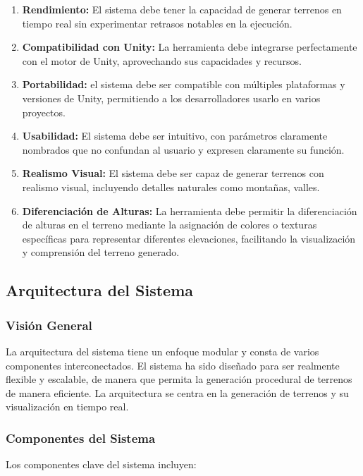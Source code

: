 \begin{enumerate}
    \item \textbf{Rendimiento:} El sistema debe tener la capacidad de generar terrenos en tiempo real sin experimentar retrasos notables en la ejecución.
    
    \item \textbf{Compatibilidad con Unity:} La herramienta debe integrarse perfectamente con el motor de Unity, aprovechando sus capacidades y recursos.
    
    \item \textbf{Portabilidad:} el sistema debe ser compatible con múltiples plataformas y versiones de Unity, permitiendo a los desarrolladores usarlo en varios proyectos.
    
    \item \textbf{Usabilidad:} El sistema debe ser intuitivo, con parámetros claramente nombrados que no confundan al usuario y expresen claramente su función.
    
    \item \textbf{Realismo Visual:} El sistema debe ser capaz de generar terrenos con realismo visual, incluyendo detalles naturales como montañas, valles.
    
    \item \textbf{Diferenciación de Alturas:} La herramienta debe permitir la diferenciación de alturas en el terreno mediante la asignación de colores o texturas específicas para representar diferentes elevaciones, facilitando la visualización y comprensión del terreno generado.

\end{enumerate}

\subsection{Arquitectura del Sistema}

\subsubsection{Visión General}
La arquitectura del sistema tiene un enfoque modular y consta de varios componentes interconectados. El sistema ha sido diseñado para ser realmente flexible y escalable, de manera que permita la generación procedural de terrenos de manera eficiente. La arquitectura se centra en la generación de terrenos y su visualización en tiempo real.

\subsubsection{Componentes del Sistema}
Los componentes clave del sistema incluyen:

